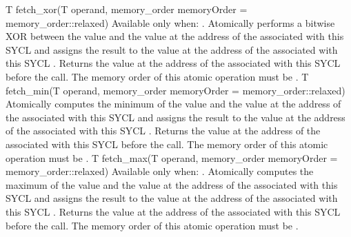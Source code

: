   \addRowTwoL
    { T fetch_xor(T operand, memory_order memoryOrder = }
    { memory_order::relaxed) }
    {
      Available only when: .
      \newline
      Atomically performs a bitwise XOR between the value 
      and the value at the address of the  associated with
      this SYCL  and assigns the result to the value at the
      address of the  associated with this SYCL
      . Returns the value at the address of the  associated with this SYCL  before the call.
      The memory order of this atomic operation must be .
    }
  \addRowTwoL
    { T fetch_min(T operand, memory_order memoryOrder = }
    { memory_order::relaxed) }
    {
      Atomically computes the minimum of the value  and the
      value at the address of the  associated with this
      SYCL  and assigns the result to the value at the address
      of the  associated with this SYCL . Returns the value at the address of the 
      associated with this SYCL  before the call. The memory
      order of this atomic operation must be .
    }
  \addRowTwoL
    { T fetch_max(T operand, memory_order memoryOrder = }
    { memory_order::relaxed) }
    {
      Available only when: .
      \newline
      Atomically computes the maximum of the value  and the
      value at the address of the  associated with this
      SYCL  and assigns the result to the value at the address
      of the  associated with this SYCL . Returns the value at the address of the 
      associated with this SYCL  before the call. The memory
      order of this atomic operation must be .
    }
\completeInfoTable

